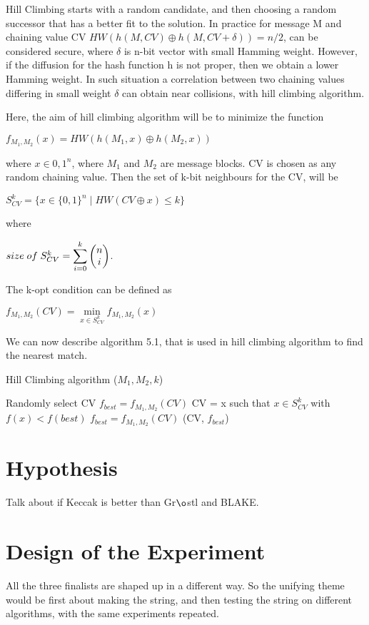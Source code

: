 Hill Climbing starts with a random candidate, and then choosing a random successor that has a better fit to the
solution. In practice for message M and chaining value CV $HW( h(M, CV) \oplus h(M, CV + \delta) ) = n / 2 $, can be considered
secure, where $\delta$ is n-bit vector with small Hamming weight. However, if the diffusion for the hash function h is 
not proper, then we obtain a lower Hamming weight. In such situation a correlation between two chaining values differing
in small weight $\delta$ can obtain near collisions, with hill climbing algorithm.

Here, the aim of hill climbing algorithm will be to minimize the function 

$f_{M_{1}, M_{2}}(x) = HW( h(M_{1}, x) \oplus h(M_{2}, x) )$

where $x \in {0, 1}^{n}$, where $M_{1}$ and $M_{2}$ are message blocks. CV is chosen as any random chaining value. Then the 
set of k-bit neighbours for the CV, will be 

$S^{k}_{CV} = \{ x \in \{0, 1\}^{n} \mid HW( CV \oplus x ) \leq k \}$

where 

$ size \thickspace of \thickspace S^{k}_{CV} = \displaystyle \sum \limits_{i = 0}^{k} \begin{pmatrix} n \\ i \end{pmatrix}$.

The k-opt condition can be defined as 

$f_{M_{1}, M_{2}} (CV) =  \min\limits_{x \in S^{k}_{CV}} f_{M_{1}, M_{2}} (x)$

We can now describe algorithm 5.1, that is used in hill climbing algorithm to find the nearest match. 

\begin{algorithm}
  \caption{ Hill Climbing algorithm ($M_{1}, M_{2}, k$) }
  \begin{algorithmic}[1]
    \State Randomly select CV
    \State $f_{best} = f_{M_{1}, M_{2}}(CV)$
    \State {}
    \State CV = x such that $x \in S^{k}_{CV}$ with $f(x) < f(best)$
    \State $f_{best} = f_{M_{1}, M_{2}}(CV)$
    \State \EndWhile
    \State \Return (CV, $f_{best}$)
  \end{algorithmic}
\end{algorithm}

\section{Hypothesis}
Talk about if Keccak is better than Gr$\o$stl and BLAKE.

\section{Design of the Experiment}
All the three finalists are shaped up in a different way. So the unifying theme would be first about making the 
string, and then testing the string on different algorithms, with the same experiments repeated.
